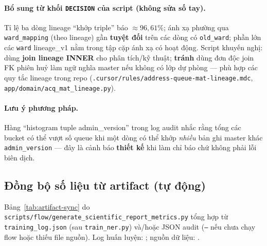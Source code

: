 \paragraph{Bổ sung từ khối \texttt{DECISION} của script (không sửa số tay).}
Tỉ lệ ba dòng lineage ``khớp triple'' báo \(\approx 96{,}61\%\); ánh xạ phường qua \texttt{ward\_mapping} (theo lineage) gần \textbf{tuyệt đối} trên các dòng có \texttt{old\_ward}; phần lớn các \texttt{ward} lineage\_v1 nằm trong tập cặp ánh xạ có hoạt động. Script khuyến nghị: dùng \textbf{join lineage INNER} cho phân tích/kỹ thuật; \textbf{tránh} dùng đơn độc join FK phiên huỷ làm ngữ nghĩa master nếu không có lớp dự phòng --- phù hợp các quy tắc lineage trong repo (\texttt{.cursor/rules/address-queue-mat-lineage.mdc}, \texttt{app/domain/acq\_mat\_lineage.py}).

\paragraph{Lưu ý phương pháp.}
Hàng ``histogram tuple admin\_version'' trong log audit nhắc rằng tổng các bucket có thể vượt số queue khi một dòng có thể khớp \emph{nhiều} bản ghi master khác \texttt{admin\_version} --- đây là cảnh báo \textbf{thiết kế} khi làm chỉ báo chứ không phải lỗi biên dịch.

\subsection{Đồng bộ số liệu từ artifact (tự động)}
Bảng~\ref{tab:artifact-sync} do \texttt{scripts/flow/generate\_scientific\_report\_metrics.py} tổng hợp từ \texttt{training\_log.json} (sau \texttt{train\_ner.py}) và/hoặc JSON audit (\texttt{---} nếu chưa chạy flow hoặc thiếu file nguồn). Log huấn luyện: \texttt{\VNAIGENTrainLogPath}; nguồn dữ liệu: \texttt{\VNAIGENTrainSource}.

